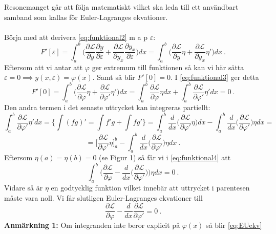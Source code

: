 \documentclass{article}
\begin{document}
Resonemanget går att följa matematiskt vilket ska leda till ett användbart samband som kallas för Euler-Lagranges ekvationer.\\ \\
Börja med att derivera \eqref{eq:funktional2} m a p $\varepsilon$:
\begin{equation}\label{eq:funktional3}
    F'[\varepsilon]=\int_a^b\Big(\frac{\partial \mathcal{L}}{\partial y}\frac{\partial y}{\partial \varepsilon}+\frac{\partial \mathcal{L}}{\partial y_x}\frac{\partial y_x}{\partial \varepsilon}\Big)dx=\int_a^b\Big(\frac{\partial \mathcal{L}}{\partial y}\eta+\frac{\partial \mathcal{L}}{\partial y_x}\eta'\Big)dx \ .
\end{equation}
Eftersom att vi antar att $\varphi$ ger extremum till funktionen så kan vi här sätta $\varepsilon=0\implies y(x,\varepsilon)=\varphi(x)$. Samt så blir $F'[0]=0$. I \eqref{eq:funktional3} ger detta
\begin{equation}\label{eq:funktional4}
    F'[0]=\int_a^b\Big(\frac{\partial \mathcal{L}}{\partial \varphi}\eta+\frac{\partial \mathcal{L}}{\partial \varphi'}\eta'\Big)dx=\int_a^b\frac{\partial \mathcal{L}}{\partial \varphi}\eta dx +\int_a^b\frac{\partial \mathcal{L}}{\partial \varphi'}\eta'dx=0 \ .
\end{equation}
Den andra termen i det senaste uttrycket kan integreras partiellt:
$$
\int_a^b\frac{\partial \mathcal{L}}{\partial \varphi'}\eta'dx=\Big\{\int(fg)'=\int f'g+\int fg'\Big\}=\int_a^b\frac{d}{dx}\Big(\frac{\partial \mathcal{L}}{\partial \varphi'}\eta\Big)dx-\int_a^b\frac{d}{dx}\Big(\frac{\partial \mathcal{L}}{\partial \varphi'}\Big)\eta dx=
$$
\begin{equation}\label{eq:varkalk1}
    =\Big[\frac{\partial \mathcal{L}}{\partial \varphi'}\eta\Big]_a^b-\int_a^b \frac{d}{dx}\Big(\frac{\partial \mathcal{L}}{\partial \varphi'}\Big)\eta dx \ .
\end{equation}
Eftersom $\eta(a)=\eta(b)=0$ (se Figur 1) så får vi i \eqref{eq:funktional4} att
$$
\int_a^b\Big(\frac{\partial \mathcal{L}}{\partial \varphi}- \frac{d}{dx}\Big(\frac{\partial \mathcal{L}}{\partial \varphi'}\Big)\Big)\eta dx=0 \ .
$$
Vidare så är $\eta$ en godtycklig funktion vilket innebär att uttrycket i parentesen måste vara noll. Vi får slutligen Euler-Lagranges ekvationer till
\begin{equation}\label{eq:EUekv}
    \frac{\partial \mathcal{L}}{\partial \varphi}-\frac{d}{dx}\frac{\partial\mathcal{L}}{\partial\varphi'}=0 \ .
\end{equation}
\textbf{Anmärkning 1:} Om integranden inte beror explicit på $\varphi(x)$ så blir \eqref{eq:EUekv}
\end{document}
